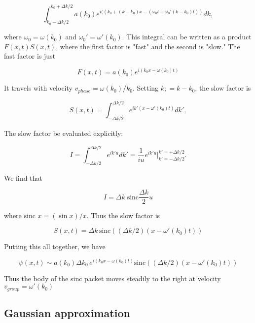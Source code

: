 \begin{equation}
 \int_{k_0 - \Delta k/2}^{k_0 + \Delta k/2}  a(k_0)e^{i((k_0 + (k - k_0)x - (\omega_0t + \omega_0'(k - k_0)t))}dk,
\end{equation}

where $\omega_0 = \omega(k_0)$ and $\omega_0' = \omega'(k_0)$.
This integral can be written as a product $F(x,t)S(x,t)$, where the first factor is "fast" and the second is "slow."  The fast factor is just

\begin{equation}
F(x,t) = a(k_0)e^{ i(k_0x - \omega(k_0)t) }
\end{equation}

It travels with velocity $v_{phase} = \omega(k_0)/k_0$.  Setting $k; = k- k_0$, the slow factor is

\begin{equation}
S(x,t) = \int_{-\Delta k/2}^{\Delta k/2} e^{ik'\left(x - \omega'(k_0)t\right)} dk',
\end{equation}

The slow factor be evaluated explicitly:

\begin{equation}
I = \int_{-\Delta k/2}^{\Delta k/2} e^{ik'u} dk' = \frac{1}{iu} e^{ik'u}\Big\vert_{k' = - \Delta k/2}^{k' = +\Delta k/2}.
\end{equation}

We find that

\begin{equation}
I = \Delta k\; \text{sinc}\frac{\Delta k}{2}u
\end{equation}

where $\text{sinc } x = (\sin x )/x$.  Thus the slow factor is

\begin{equation}
S(x,t) = \Delta k\, \text{sinc}(  (\Delta k/2)(x - \omega'(k_0)t)  )
\end{equation}


Putting this all together, we have

\begin{equation}
\psi(x,t) \sim a(k_0)\Delta k_0\, e^{i(k_0x - \omega(k_0)t)}\text{sinc}(  (\Delta k/2)(x - \omega'(k_0)t)  )
\end{equation}

Thus the body of the sinc packet moves steadily to the right at velocity $v_{group} = \omega'(k_0)$


\subsection{Gaussian approximation}

